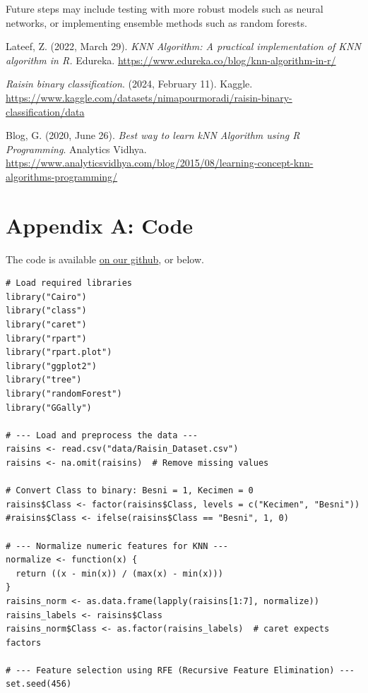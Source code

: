 \documentclass{article}
\begin{document}
\vspace{5mm}

\noindent Future steps may include testing with more robust models such as neural networks, or implementing ensemble methods such as random forests.

\begin{thebibliography}{9}

Lateef, Z. (2022, March 29). \emph{KNN Algorithm: A practical implementation of KNN algorithm in R.} Edureka. \url{https://www.edureka.co/blog/knn-algorithm-in-r/}

\emph{Raisin binary classification}. (2024, February 11). Kaggle. \url{https://www.kaggle.com/datasets/nimapourmoradi/raisin-binary-classification/data}


Blog, G. (2020, June 26). \emph{Best way to learn kNN Algorithm using R Programming}. Analytics Vidhya. \url{https://www.analyticsvidhya.com/blog/2015/08/learning-concept-knn-algorithms-programming/}

\newpage

\section*{Appendix A: Code}
\label{sec:appendixA}
The code is available \href{https://github.com/mshki/math-456/blob/main/essay_4/main.R}{on our github}, or below.

\begin{verbatim}
# Load required libraries
library("Cairo")
library("class")
library("caret")
library("rpart")
library("rpart.plot")
library("ggplot2")
library("tree")
library("randomForest")
library("GGally")

# --- Load and preprocess the data ---
raisins <- read.csv("data/Raisin_Dataset.csv")
raisins <- na.omit(raisins)  # Remove missing values

# Convert Class to binary: Besni = 1, Kecimen = 0
raisins$Class <- factor(raisins$Class, levels = c("Kecimen", "Besni"))
#raisins$Class <- ifelse(raisins$Class == "Besni", 1, 0)

# --- Normalize numeric features for KNN ---
normalize <- function(x) {
  return ((x - min(x)) / (max(x) - min(x)))
}
raisins_norm <- as.data.frame(lapply(raisins[1:7], normalize))
raisins_labels <- raisins$Class
raisins_norm$Class <- as.factor(raisins_labels)  # caret expects factors

# --- Feature selection using RFE (Recursive Feature Elimination) ---
set.seed(456)


\end{verbatim}
\end{thebibliography}
\end{document}
